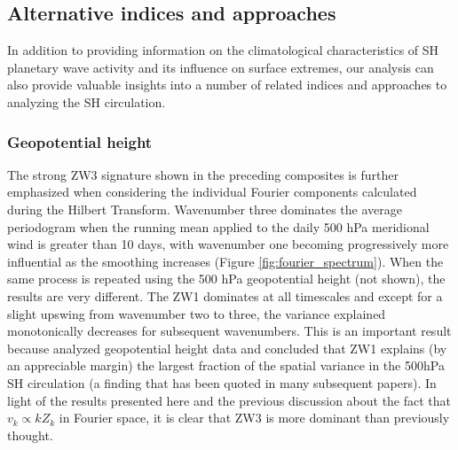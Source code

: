 \subsection{Alternative indices and approaches}

In addition to providing information on the climatological characteristics of SH planetary wave activity and its influence on surface extremes, our analysis can also provide valuable insights into a number of related indices and approaches to analyzing the SH circulation.

\subsubsection{Geopotential height}\label{s:geopotential_height}

The strong ZW3 signature shown in the preceding composites is further emphasized when considering the individual Fourier components calculated during the Hilbert Transform. Wavenumber three dominates the average periodogram when the running mean applied to the daily 500 hPa meridional wind is greater than 10 days, with wavenumber one becoming progressively more influential as the smoothing increases (Figure \ref{fig:fourier_spectrum}). When the same process is repeated using the 500 hPa geopotential height (not shown), the results are very different. The ZW1 dominates at all timescales and except for a slight upswing from wavenumber two to three, the variance explained monotonically decreases for subsequent wavenumbers. This is an important result because \citet{vanLoon1972} analyzed geopotential height data and concluded that ZW1 explains (by an appreciable margin) the largest fraction of the spatial variance in the 500hPa SH circulation (a finding that has been quoted in many subsequent papers). In light of the results presented here and the previous discussion about the fact that $v_k \propto k Z_k$ in Fourier space, it is clear that ZW3 is more dominant than previously thought. 